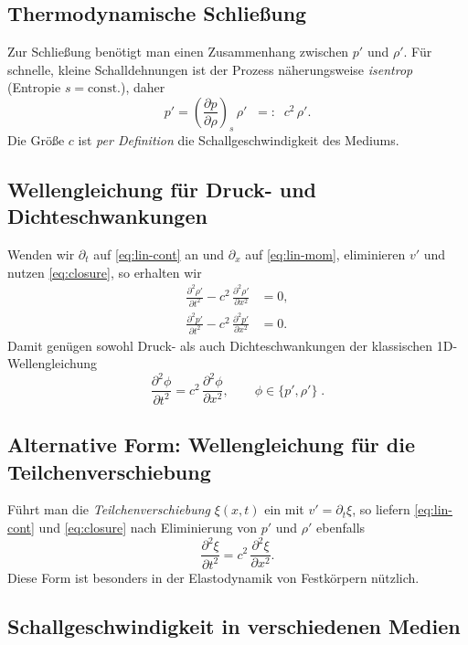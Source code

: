 \subsection{Thermodynamische Schließung}
Zur Schließung benötigt man einen Zusammenhang zwischen $p'$ und $\rho'$.
Für schnelle, kleine Schalldehnungen ist der Prozess näherungsweise \emph{isentrop} (Entropie $s=\mathrm{const.}$), daher
\begin{equation}
    p'= \left(\frac{\partial p}{\partial \rho}\right)_{s}\,\rho' \;\;=: \;\; c^2\,\rho'.
    \label{eq:closure}
\end{equation}
Die Größe $c$ ist \emph{per Definition} die Schallgeschwindigkeit des Mediums.

\subsection{Wellengleichung für Druck- und Dichteschwankungen}
Wenden wir $\partial_t$ auf \eqref{eq:lin-cont} an und $\partial_x$ auf \eqref{eq:lin-mom}, eliminieren $v'$ und nutzen \eqref{eq:closure}, so erhalten wir
\begin{align}
    \frac{\partial^2 \rho'}{\partial t^2} - c^2\,\frac{\partial^2 \rho'}{\partial x^2} &= 0, \\
    \frac{\partial^2 p'}{\partial t^2} - c^2\,\frac{\partial^2 p'}{\partial x^2} &= 0.
\end{align}
Damit genügen sowohl Druck- als auch Dichteschwankungen der klassischen 1D-Wellengleichung
\begin{equation}
    \boxed{\;\;\frac{\partial^2 \phi}{\partial t^2} = c^2\,\frac{\partial^2 \phi}{\partial x^2}, \qquad \phi\in\{p',\rho'\}\; .\;\;}
\end{equation}

\subsection{Alternative Form: Wellengleichung für die Teilchenverschiebung}
Führt man die \emph{Teilchenverschiebung} $\xi(x,t)$ ein mit $v'=\partial_t \xi$, so liefern \eqref{eq:lin-cont} und \eqref{eq:closure} nach Eliminierung von $p'$ und $\rho'$ ebenfalls
\begin{equation}
    \frac{\partial^2 \xi}{\partial t^2} = c^2\,\frac{\partial^2 \xi}{\partial x^2}.
\end{equation}
Diese Form ist besonders in der Elastodynamik von Festkörpern nützlich.

\subsection{Schallgeschwindigkeit in verschiedenen Medien}

